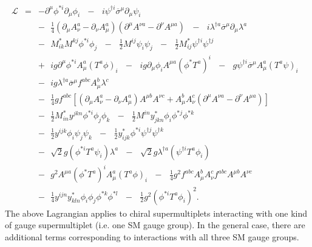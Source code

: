 \documentclass[dissertation.tex]{subfiles}
\begin{document}
\begin{eqnarray}
\label{eq:L_final}
\mathcal{L} &=& -\partial^{\mu}\phi^{*i}\partial_{\mu}\phi_{i}\mbox{ }-\mbox{ }i\psi^{\dag i}\overline{\sigma}^{\mu}\partial_{\mu}\psi_{i}\mbox{ }\nonumber \\
&&-\mbox{ }\frac{1}{4}(\partial_{\mu}A_{\nu}^{a} - \partial_{\nu}A_{\mu}^{a})(\partial^{\mu}A^{\nu a} - \partial^{\nu}A^{\mu a})\mbox{ }-\mbox{ }i\lambda^{\dag a}\overline{\sigma}^{\mu}\partial_{\mu}\lambda^{a}\mbox{ }\nonumber \\
&&-\mbox{ }M_{ik}^{*}M^{kj}\phi^{*i}\phi_{j}\mbox{ }-\mbox{ }\frac{1}{2}M^{ij}\psi_{i}\psi_{j}\mbox{ }-\mbox{ }\frac{1}{2}M_{ij}^{*}\psi^{\dag i}\psi^{\dag j}\mbox{ }\nonumber \\
&&+\mbox{ }ig\partial^{\mu}\phi^{*i}A_{\mu}^{a}(T^{a}\phi)_{i}\mbox{ }-\mbox{ }ig\partial_{\mu}\phi_{i}A^{\mu a}(\phi^{*}T^{a})^{i}\mbox{ }-\mbox{ }g\psi^{\dag i}\overline{\sigma}^{\mu}A_{\mu}^{a}(T^{a}\psi)_{i}\mbox{ }\nonumber \\
&&-\mbox{ }ig\lambda^{\dag a}\overline{\sigma}^{\mu}f^{abc}A_{\mu}^{b}\lambda^{c}\mbox{ }\nonumber \\
&&-\mbox{ }\frac{1}{4}gf^{abc}[(\partial_{\mu}A_{\nu}^{a} - \partial_{\nu}A_{\mu}^{a})A^{\mu b}A^{\nu c} + A_{\mu}^{b}A_{\nu}^{c}(\partial^{\mu}A^{\nu a} - \partial^{\nu}A^{\mu a})]\nonumber \\
&&-\mbox{ }\frac{1}{2}M_{in}^{*}y^{jkn}\phi^{*i}\phi_{j}\phi_{k}\mbox{ }-\mbox{ }\frac{1}{2}M^{in}y_{jkn}^{*}\phi_{i}\phi^{*j}\phi^{*k}\mbox{ }\nonumber \\
&&-\mbox{ }\frac{1}{2}y^{ijk}\phi_{i}\psi_{j}\psi_{k}\mbox{ }-\mbox{ }\frac{1}{2}y_{ijk}^{*}\phi^{*i}\psi^{\dag j}\psi^{\dag k}\mbox{ }\nonumber \\
&&-\mbox{ }\sqrt{2}g(\phi^{*i}T^{a}\psi_{i})\lambda^{a}\mbox{ }-\mbox{ }\sqrt{2}g\lambda^{\dag a}(\psi^{\dag i}T^{a}\phi_{i})\nonumber \\
&&-\mbox{ }g^{2}A^{\mu a}(\phi^{*}T^{a})^{i}A_{\mu}^{a}(T^{a}\phi)_{i}\mbox{ }-\mbox{ }\frac{1}{4}g^{2}f^{abc}A_{\mu}^{b}A_{\nu}^{c}f^{abc}A^{\mu b}A^{\nu c}\nonumber \\
&&-\mbox{ }\frac{1}{4}y^{ijn}y_{kln}^{*}\phi_{i}\phi_{j}\phi^{*k}\phi^{*l}\mbox{ }-\mbox{ }\frac{1}{2}g^{2}(\phi^{*i}T^{a}\phi_{i})^{2}.
\end{eqnarray}
%
The above Lagrangian applies to chiral supermultiplets interacting with one kind of gauge supermultiplet (i.e. one SM gauge group).  In the general case, there are additional terms corresponding to interactions with all three SM gauge groups.
\end{document}
